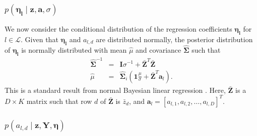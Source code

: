 \documentclass{article}
\begin{document}
\subsubsection{$p\left(\mathbf{\eta_{l}}\mid\mathbf{z},\mathbf{a},\sigma\right)$}

We now consider the conditional distribution of the regression coefficients
$\mathbf{\eta_{l}}$ for $l\in\mathcal{L}$. Given that $\mathbf{\eta_{l}}$
and $a_{l,d}$ are distributed normally, the posterior distribution
of $\mathbf{\eta_{l}}$ is normally distributed with mean $\hat{\mu}$
and covariance $\hat{\mathbf{\Sigma}}$ such that %
\begin{eqnarray}
\hat{\mathbf{\Sigma}}^{-1} & = & \mathbf{I}\sigma^{-1}+\bar{\mathbf{Z}}^{T}\bar{\mathbf{Z}}\\
\hat{\mu} & = & \hat{\mathbf{\Sigma}}_{i}\left(\mathbf{1}\frac{\mu}{\sigma}+\bar{\mathbf{Z}}^{T}\mathbf{a}_{l}\right).\end{eqnarray}
 This is a standard result from normal Bayesian linear regression
\citep{BishopPRML}. Here, $\bar{\mathbf{Z}}$ is a $D\times K$ matrix
such that row $d$ of $\mathbf{\bar{Z}}$ is $\bar{z}_{d}$, and $\mathbf{a}_{l}=[a_{l,1},a_{l,2},\ldots,a_{l,D}]^{T}$.



\subsubsection{$p\left(a_{l,d}\mid\mathbf{z},\mathbf{Y},\mathbf{\eta}\right)$}
\end{document}
